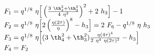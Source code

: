 \begin{equation}
  \begin{array}{l}
F_1 = q^{1/8} ~\eta \Big[ \left( {3~\th_4^2 +\th_3^2  \over
     4~\eta^2 }\right)^2  + 2~h_3 \Big] -1 \\
F_2 = q^{1/8} ~\eta \Big[ 2 \left( {\eta(2\tau) \over
     \eta } \right)^8 -h_3  \Big]  = 2 ~F_6 - q^{1/8} ~\eta ~h_3 \\
F_3 =  q^{1/8} ~\eta \Big[ (3~\th_4^2 +\th_3^2) {\eta(4\tau)^4 \over
     2~\eta^4 ~\eta(2\tau)^2 } -h_3 \Big] \\
F_4 = F_2
\end{array}
\end{equation}

